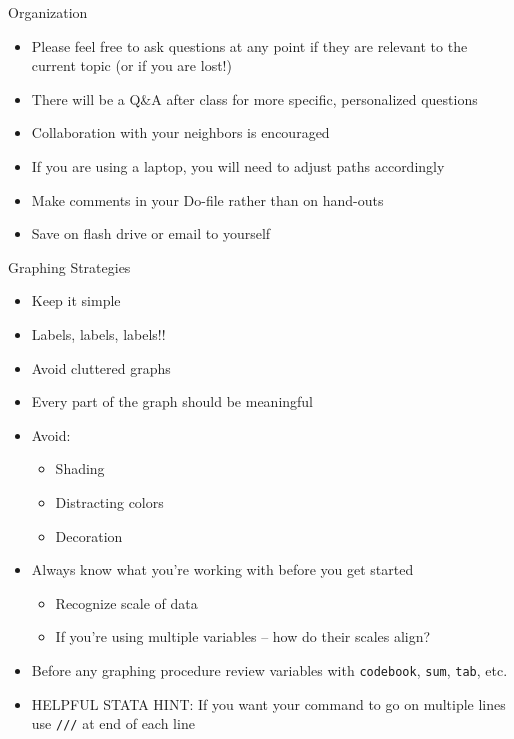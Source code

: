\documentclass[table,smaller]{beamer}
\begin{document}
\begin{frame}[fragile,label=sec-1-2]{Organization}
 \begin{itemize}
\item Please feel free to ask questions at any point if they are relevant to the current topic (or if you are lost!)
\item There will be a Q\&A after class for more specific, personalized questions
\item Collaboration with your neighbors is encouraged
\item If you are using a laptop, you will need to adjust paths accordingly
\item Make comments in your Do-file rather than on hand-outs
\item Save on flash drive or email to yourself
\end{itemize}


\begin{block}{Graphing Strategies}
\begin{itemize}
\item Keep it simple
\item Labels, labels, labels!!
\item Avoid cluttered graphs
\item Every part of the graph should be meaningful
\item Avoid:
\begin{itemize}
\item Shading
\item Distracting colors
\item Decoration
\end{itemize}

\item Always know what you’re working with before you get started
\begin{itemize}
\item Recognize scale of data
\item If you’re using multiple variables – how do their scales align?
\end{itemize}
\item Before any graphing procedure review variables with \texttt{codebook}, \texttt{sum}, \texttt{tab}, etc.
\item HELPFUL STATA HINT:  If you want your command to go on multiple lines use \texttt{///} at end of each line
\end{itemize}
\end{block}


\end{frame}
\end{document}

